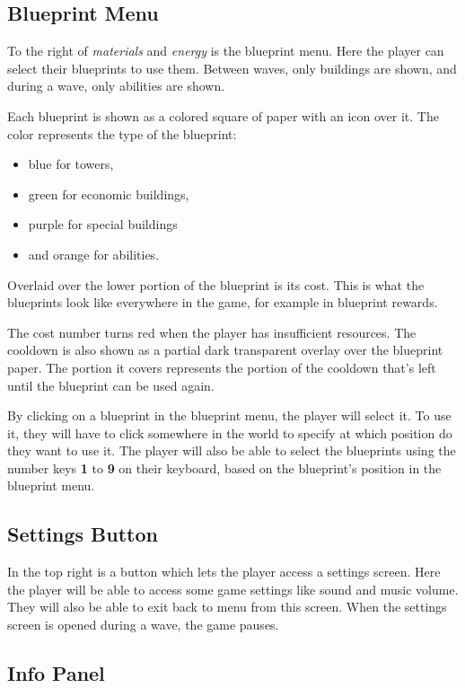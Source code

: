 \subsection{Blueprint Menu}

To the right of \emph{materials} and \emph{energy} is the blueprint menu.
Here the player can select their blueprints to use them.
Between waves, only buildings are shown, and during a wave, only abilities are shown.

Each blueprint is shown as a colored square of paper with an icon over it.
The color represents the type of the blueprint:
\begin{itemize}
    \item blue for towers,
    \item green for economic buildings,
    \item purple for special buildings
    \item and orange for abilities.
\end{itemize}
Overlaid over the lower portion of the blueprint is its cost.
This is what the blueprints look like everywhere in the game, for example in blueprint rewards.

The cost number turns red when the player has insufficient resources.
The cooldown is also shown as a partial dark transparent overlay over the blueprint paper.
The portion it covers represents the portion of the cooldown that's left until the blueprint can be used again.

By clicking on a blueprint in the blueprint menu, the player will select it.
To use it, they will have to click somewhere in the world to specify at which position do they want to use it.
The player will also be able to select the blueprints using the number keys \textbf{1} to \textbf{9} on their keyboard, based on the blueprint's position in the blueprint menu.

\subsection{Settings Button}

In the top right is a button which lets the player access a settings screen.
Here the player will be able to access some game settings like sound and music volume.
They will also be able to exit back to menu from this screen.
When the settings screen is opened during a wave, the game pauses.

\subsection{Info Panel}\label{sec:design-info-panel}

